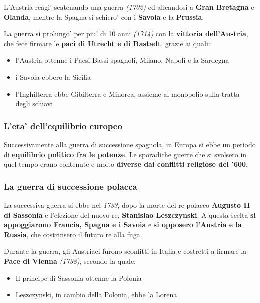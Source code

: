\documentclass{article}
\begin{document}
{{    L'Austria reagi' scatenando una guerra \textit{(1702)} ed alleandosi a \textbf{Gran Bretagna} e \textbf{Olanda}, mentre la Spagna si schiero' con i \textbf{Savoia} e la \textbf{Prussia}.

    La guerra si prolungo' per piu' di 10 anni \textit{(1714)} con la \textbf{vittoria dell'Austria}, che fece firmare le \textbf{paci di Utrecht e di Rastadt}, grazie ai quali:

    \begin{itemize}
      \item l'Austria ottenne i Paesi Bassi spagnoli, Milano, Napoli e la Sardegna
      \item i Savoia ebbero la Sicilia
      \item l'Inghilterra ebbe Gibilterra e Minorca, assieme al monopolio sulla tratta degli schiavi
    \end{itemize}

    \subsubsection{L'eta' dell'equilibrio europeo} %
    Successivamente alla guerra di successione spagnola, in Europa si ebbe un periodo di \textbf{equilibrio politico fra le potenze}. Le sporadiche guerre che si svolsero in quel tempo erano contenute e molto \textbf{diverse dai conflitti religiose del '600}.

    \subsubsection{La guerra di successione polacca} %
    La successiva guerra si ebbe nel \textit{1733}, dopo la morte del re polacco \textbf{Augusto II di Sassonia} e l'elezione del nuovo re, \textbf{Stanislao Leszczynski}. A questa scelta \textbf{si appoggiarono Francia, Spagna e i Savoia} e \textbf{si opposero l'Austria e la Russia}, che costrinsero il futuro re alla fuga.

    Durante la guerra, gli Austriaci furono sconfitti in Italia e costretti a firmare la \textbf{Pace di Vienna} \textit{(1738)}, secondo la quale:

    \begin{itemize}
      \item Il principe di Sassonia ottenne la Polonia
      \item Leszczynski, in cambio della Polonia, ebbe la Lorena
    \end{itemize}

}}
\end{document}
